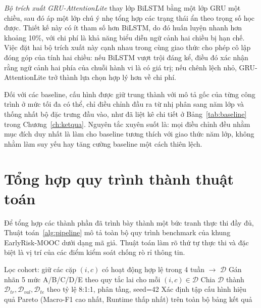 \textit{Bộ trích xuất GRU-AttentionLite} thay lớp BiLSTM bằng một lớp GRU một chiều, sau đó áp một lớp chú ý nhẹ tổng hợp các trạng thái ẩn theo trọng số học được. Thiết kế này có ít tham số hơn BiLSTM, do đó huấn luyện nhanh hơn khoảng 10\%, với chi phí là khả năng biểu diễn ngữ cảnh hai chiều bị hạn chế. Việc đặt hai bộ trích xuất này cạnh nhau trong cùng giao thức cho phép cô lập đóng góp của tính hai chiều: nếu BiLSTM vượt trội đáng kể, điều đó xác nhận rằng ngữ cảnh hai phía của chuỗi hành vi là có giá trị; nếu chênh lệch nhỏ, GRU-AttentionLite trở thành lựa chọn hợp lý hơn về chi phí.

Đối với các baseline, cấu hình được giữ trung thành với mô tả gốc của từng công trình ở mức tối đa có thể, chỉ điều chỉnh đầu ra từ nhị phân sang năm lớp và thống nhất bộ đặc trưng đầu vào, như đã liệt kê chi tiết ở Bảng~\ref{tab:baseline} trong Chương~\ref{ch:ketqua}. Nguyên tắc xuyên suốt là: mọi điều chỉnh đều nhằm mục đích duy nhất là làm cho baseline tương thích với giao thức năm lớp, không nhằm làm suy yếu hay tăng cường baseline một cách thiên lệch.

\section{Tổng hợp quy trình thành thuật toán}
\label{sec:thuattoan}

Để tổng hợp các thành phần đã trình bày thành một bức tranh thực thi đầy đủ, Thuật toán~\ref{alg:pipeline} mô tả toàn bộ quy trình benchmark của khung EarlyRisk-MOOC dưới dạng mã giả. Thuật toán làm rõ thứ tự thực thi và đặc biệt là vị trí của các điểm kiểm soát chống rò rỉ thông tin.

\begin{algorithm}[H]
\caption{Quy trình benchmark EarlyRisk-MOOC}
\label{alg:pipeline}
\BlankLine
Lọc cohort: giữ các cặp $(i,c)$ có hoạt động hợp lệ trong 4 tuần $\rightarrow$ $\mathcal{D}$\;
Gán nhãn 5 mức A/B/C/D/E theo quy tắc lai cho mỗi $(i,c) \in \mathcal{D}$\;
Chia $\mathcal{D}$ thành $\mathcal{D}_{tr}, \mathcal{D}_{val}, \mathcal{D}_{te}$ theo tỷ lệ 8:1:1, phân tầng, seed=42\;
Xác định tập cấu hình hiệu quả Pareto (Macro-F1 cao nhất, Runtime thấp nhất) trên toàn bộ bảng kết quả\;
\;
\end{algorithm}

